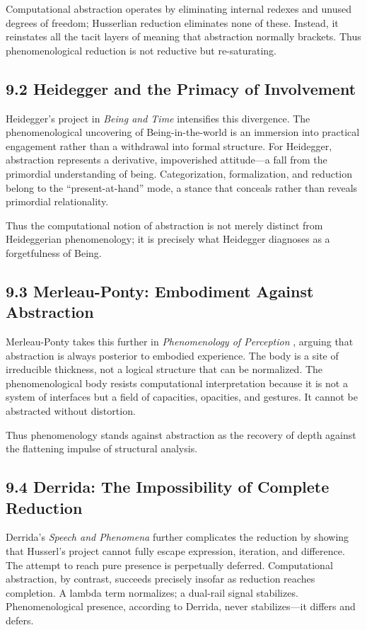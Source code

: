 \documentclass[12pt,letterpaper]{article}
\begin{document}
Computational abstraction operates by eliminating internal redexes and unused degrees of freedom; Husserlian reduction eliminates none of these. Instead, it reinstates all the tacit layers of meaning that abstraction normally brackets. Thus phenomenological reduction is not reductive but re-saturating.

\subsection{9.2 Heidegger and the Primacy of Involvement}
Heidegger’s project in \textit{Being and Time} \parencite{Heidegger1927} intensifies this divergence. The phenomenological uncovering of Being-in-the-world is an immersion into practical engagement rather than a withdrawal into formal structure. For Heidegger, abstraction represents a derivative, impoverished attitude—a fall from the primordial understanding of being. Categorization, formalization, and reduction belong to the “present-at-hand” mode, a stance that conceals rather than reveals primordial relationality.

Thus the computational notion of abstraction is not merely distinct from Heideggerian phenomenology; it is precisely what Heidegger diagnoses as a forgetfulness of Being.

\subsection{9.3 Merleau-Ponty: Embodiment Against Abstraction}
Merleau-Ponty takes this further in \textit{Phenomenology of Perception} \parencite{MerleauPonty1945}, arguing that abstraction is always posterior to embodied experience. The body is a site of irreducible thickness, not a logical structure that can be normalized. The phenomenological body resists computational interpretation because it is not a system of interfaces but a field of capacities, opacities, and gestures. It cannot be abstracted without distortion.

Thus phenomenology stands against abstraction as the recovery of depth against the flattening impulse of structural analysis.

\subsection{9.4 Derrida: The Impossibility of Complete Reduction}
Derrida’s \textit{Speech and Phenomena} \parencite{Derrida1967} further complicates the reduction by showing that Husserl’s project cannot fully escape expression, iteration, and difference. The attempt to reach pure presence is perpetually deferred. Computational abstraction, by contrast, succeeds precisely insofar as reduction reaches completion. A lambda term normalizes; a dual-rail signal stabilizes. Phenomenological presence, according to Derrida, never stabilizes—it differs and defers.
\end{document}
